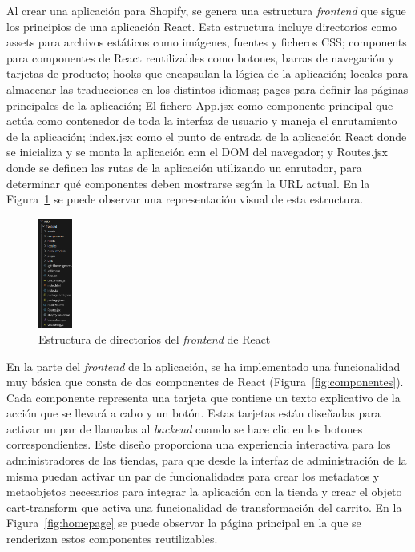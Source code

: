 \documentclass[11pt]{article}
\begin{document}
Al crear una aplicación para Shopify, se genera una estructura \textit{frontend} que sigue los principios de una aplicación React. Esta estructura incluye directorios como assets para 
archivos estáticos como imágenes, fuentes y ficheros CSS; components para componentes de React reutilizables como botones, barras de navegación y tarjetas de producto; 
hooks que encapsulan la lógica de la aplicación; locales para almacenar las traducciones en los distintos idiomas; pages para definir las páginas principales de la aplicación; El fichero App.jsx como
componente principal que actúa como contenedor de toda la interfaz de usuario y maneja el enrutamiento de la aplicación; index.jsx como el punto de entrada de la aplicación React donde
se inicializa y se monta la aplicación enn el DOM del navegador; y Routes.jsx donde se definen las rutas de la aplicación utilizando un enrutador, para determinar qué componentes
deben mostrarse según la URL actual. En la Figura~\ref{fig:estructuraFront} se puede observar una representación visual de esta estructura.

\begin{figure}[H]
    \centering
    \includegraphics[width=0.1\textwidth]{imagenes-admin/EstructuraDirectoriosReact.png}
    \caption{\label{fig:estructuraFront} Estructura de directorios del \textit{frontend} de React}
    \vspace{\fill}
\end{figure}

En la parte del \textit{frontend} de la aplicación, se ha implementado una funcionalidad muy básica que consta de dos componentes de React (Figura~\ref{fig:componentes}). Cada componente representa una tarjeta que 
contiene un texto explicativo de la acción que se llevará a cabo y un botón. Estas tarjetas están diseñadas para activar un par de llamadas al \textit{backend} cuando se hace clic en los 
botones correspondientes. Este diseño proporciona una experiencia interactiva para los administradores de las tiendas, para que desde la interfaz de administración de la misma
puedan activar un par de funcionalidades para crear los metadatos y metaobjetos necesarios para integrar la aplicación con la tienda y crear el objeto cart-transform que activa una funcionalidad
de transformación del carrito. En la Figura~\ref{fig:homepage} se puede observar la página principal en la que se renderizan estos componentes reutilizables.
\end{document}
